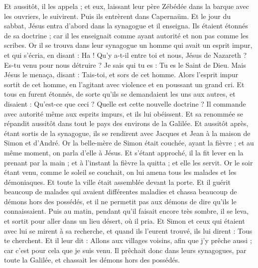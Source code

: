 \begin{multicols}{2}
Et aussitôt, il les appela ; et eux, laissant leur père Zébédée dans la barque avec les ouvriers, le suivirent.
Puis ils entrèrent dans Capernaüm. Et le jour du sabbat, Jésus entra d'abord dans la synagogue et il enseigna.
Ils étaient étonnés de sa doctrine ; car il les enseignait comme ayant autorité et non pas comme les scribes.
Or il se trouva dans leur synagogue un homme qui avait un esprit impur, et qui s'écria,
en disant : Ha ! Qu'y a-t-il entre toi et nous, Jésus de Nazareth ? Es-tu venu pour nous détruire ? Je sais qui tu es : Tu es le Saint de Dieu.
Mais Jésus le menaça, disant : Tais-toi, et sors de cet homme.
Alors l'esprit impur sortit de cet homme, en l'agitant avec violence et en poussant un grand cri.
Et tous en furent étonnés, de sorte qu'ils se demandaient les uns aux autres, et disaient : Qu'est-ce que ceci ? Quelle est cette nouvelle doctrine ? Il commande avec autorité même aux esprits impurs, et ils lui obéissent.
Et sa renommée se répandit aussitôt dans tout le pays des environs de la Galilée.
Et aussitôt après, étant sortis de la synagogue, ils se rendirent avec Jacques et Jean à la maison de Simon et d'André.
Or la belle-mère de Simon était couchée, ayant la fièvre ; et au même moment, on parla d'elle à Jésus.
Et s'étant approché, il la fit lever en la prenant par la main ; et à l'instant la fièvre la quitta ; et elle les servit.
Or le soir étant venu, comme le soleil se couchait, on lui amena tous les malades et les démoniaques.
Et toute la ville était assemblée devant la porte.
Et il guérit beaucoup de malades qui avaient différentes maladies et chassa beaucoup de démons hors des possédés, et il ne permetit pas aux démons de dire qu'ils le connaissaient.
Puis au matin, pendant qu'il faisait encore très sombre, il se leva, et sortit pour aller dans un lieu désert, où il pria.
Et Simon et ceux qui étaient avec lui se mirent à sa recherche,
et quand ils l'eurent trouvé, ils lui dirent : Tous te cherchent.
Et il leur dit : Allons aux villages voisins, afin que j'y prêche aussi ; car c'est pour cela que je suis venu.
Il prêchait donc dans leurs synagogues, par toute la Galilée, et chassait les démons hors des possédés.

\end{multicols}

